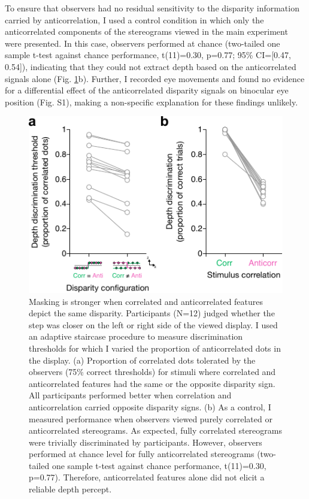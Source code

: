 To ensure that observers had no residual sensitivity to the disparity information carried by anticorrelation, I used a control condition in which only the anticorrelated components of the stereograms viewed in the main experiment were presented. In this case, observers performed at chance (two-tailed one sample t-test against chance performance, t(11)=0.30, p=0.77; 95\% CI=[0.47, 0.54]), indicating that they could not extract depth based on the anticorrelated signals alone (Fig. \ref{fig:c2f2}b). Further, I recorded eye movements and found no evidence for a differential effect of the anticorrelated disparity signals on binocular eye position (Fig. S1), making a non-specific explanation for these findings unlikely.

\begin{figure}
  \centering
  \includegraphics{Fig2}
  \caption[Masking is stronger when correlated and anticorrelated features depict the same disparity.]{Masking is stronger when correlated and anticorrelated features depict the same disparity. Participants (N=12) judged whether the step was closer on the left or right side of the viewed display. I used an adaptive staircase procedure to measure discrimination thresholds for which I varied the proportion of anticorrelated dots in the display. (a) Proportion of correlated dots tolerated by the observers (75\% correct thresholds) for stimuli where correlated and anticorrelated features had the same or the opposite disparity sign. All participants performed better when correlation and anticorrelation carried opposite disparity signs. (b) As a control, I measured performance when observers viewed purely correlated or anticorrelated stereograms. As expected, fully correlated stereograms were trivially discriminated by participants. However, observers performed at chance level for fully anticorrelated stereograms (two-tailed one sample t-test against chance performance, t(11)=0.30, p=0.77). Therefore, anticorrelated features alone did not elicit a reliable depth percept.}
  \label{fig:c2f2}
\end{figure}


